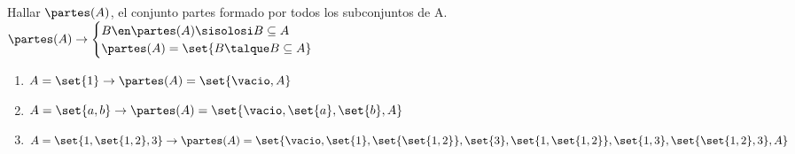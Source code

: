 \ejercicio
Hallar $\partes(A)$, el conjunto partes formado por todos los subconjuntos de A.\\
$
  \partes(A) \to
  \begin{cases}
    B \en \partes(A) \sisolosi B \subseteq A \\
    \partes(A) = \set{B \talque B \subseteq A}
  \end{cases}
$
\begin{enumerate}[label=(\roman*)]
  \item $A = \set{1} \to \partes(A) = \set{\vacio, A}$ \Tilde
  \item $A =
          \set{a, b}
          \to
          \partes(A) =
          \set{
            \vacio,
            \set{a},
            \set{b},
            A
          }$\Tilde
  \item $
          A =
          \set{1, \set{1,2}, 3}
          \to
          \partes(A) =
          \set{
            \vacio,
            \set{1},
            \set{\set{1,2}},
            \set{3},
            \set{1,\set{1,2}},
            \set{1,3},
            \set{\set{1,2},3},
            A
          }$\Tilde
\end{enumerate}
